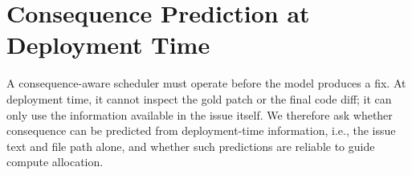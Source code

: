 \documentclass{article}
\begin{document}
\begin{table}[h]
\centering
{}
\caption{\textbf{Model audit on SWE-bench Lite.} We report sample size $n$,
configured token budget $\mathrm{max\_new}$, Spearman rank correlation
between thinking length and consequence, $p$-value, average difference
in thinking length between high- and low-consequence tasks, and the
observed failure mode relative to the cost-weighted allocation objective.}
\label{tab:audit}
\end{table}

\section{Consequence Prediction at Deployment Time}
\label{sec:pred}

A consequence-aware scheduler must operate before the model produces a
fix. At deployment time, it cannot inspect the gold patch or the final
code diff; it can only use the information available in the issue
itself. We therefore ask whether consequence can be predicted from deployment-time
information, i.e., the
issue text and file path alone, and whether such predictions are reliable to guide compute allocation.
\end{document}
